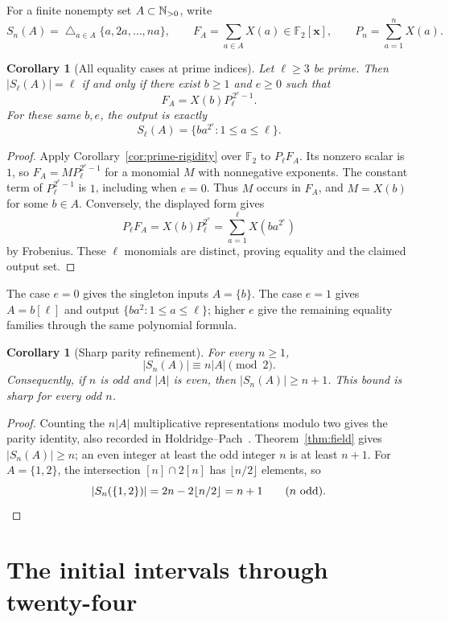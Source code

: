 \documentclass[11pt]{article}
\numberwithin{equation}{section}
\newtheorem{corollary}[theorem]{Corollary}
\theoremstyle{definition}\newtheorem{definition}[theorem]{Definition}
\theoremstyle{remark}\newtheorem{remark}[theorem]{Remark}
\begin{document}
For a finite nonempty set $A\subset\mathbb N_{>0}$, write
\[
 S_n(A)=\mathop{\triangle}_{a\in A}\{a,2a,\ldots,na\},
 \qquad F_A=\sum_{a\in A}X(a)\in\mathbb F_2[\mathbf x],
 \qquad P_n=\sum_{a=1}^n X(a).
\]

\begin{corollary}[All equality cases at prime indices]
\label{cor:binary-prime-equality}
Let $\ell\ge3$ be prime. Then $|S_\ell(A)|=\ell$ if and only if
there exist $b\ge1$ and $e\ge0$ such that
\[
 F_A=X(b)P_\ell^{\,2^e-1}.
\]
For these same $b,e$, the output is exactly
\[
 S_\ell(A)=\{ba^{2^e}:1\le a\le\ell\}.
\]
\end{corollary}
\begin{proof}
Apply Corollary~\ref{cor:prime-rigidity} over $\mathbb F_2$ to
$P_\ell F_A$. Its nonzero scalar is $1$, so
$F_A=MP_\ell^{2^e-1}$ for a monomial $M$ with nonnegative exponents.
The constant term of $P_\ell^{2^e-1}$ is $1$, including when $e=0$.
Thus $M$ occurs in $F_A$, and $M=X(b)$ for some $b\in A$.
Conversely, the displayed form gives
\[
 P_\ell F_A=X(b)P_\ell^{2^e}
 =\sum_{a=1}^{\ell}X(ba^{2^e})
\]
by Frobenius. These $\ell$ monomials are distinct, proving equality
and the claimed output set.
\end{proof}

The case $e=0$ gives the singleton inputs $A=\{b\}$. The case
$e=1$ gives $A=b[\ell]$ and output $\{ba^2:1\le a\le\ell\}$;
higher $e$ give the remaining equality families through the same
polynomial formula.

\begin{corollary}[Sharp parity refinement]\label{cor:binary-parity}
For every $n\ge1$,
\[
 |S_n(A)|\equiv n|A|\pmod2.
\]
Consequently, if $n$ is odd and $|A|$ is even, then
$|S_n(A)|\ge n+1$. This bound is sharp for every odd $n$.
\end{corollary}
\begin{proof}
Counting the $n|A|$ multiplicative representations modulo two gives
the parity identity, also recorded in Holdridge--Pach~\cite{HP}.
Theorem~\ref{thm:field} gives $|S_n(A)|\ge n$; an even integer at
least the odd integer $n$ is at least $n+1$. For $A=\{1,2\}$,
the intersection $[n]\cap2[n]$ has $\lfloor n/2\rfloor$ elements, so
\[
 |S_n(\{1,2\})|=2n-2\lfloor n/2\rfloor=n+1
 \qquad(n\text{ odd}).\qedhere
\]
\end{proof}

\appendix

\section{The initial intervals through twenty-four}
\label{sec:initial}
\end{document}
